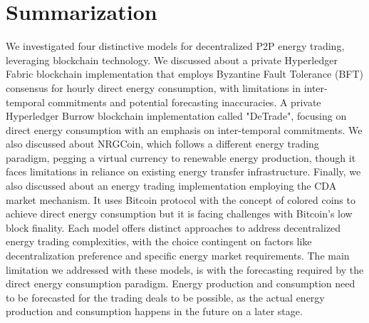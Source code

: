 \section{Summarization}
We investigated four distinctive models for decentralized P2P energy trading, leveraging blockchain technology. We discussed about a private Hyperledger Fabric blockchain implementation that employs Byzantine Fault Tolerance (BFT) 
consensus for hourly direct energy consumption, with limitations in inter-temporal commitments and potential forecasting inaccuracies. A private Hyperledger Burrow blockchain implementation called "DeTrade", focusing on direct energy 
consumption with an emphasis on inter-temporal commitments. We also discussed about NRGCoin, which follows a different energy trading paradigm, pegging a virtual currency to renewable energy production, though it faces limitations in reliance on existing 
energy transfer infrastructure. Finally, we also discussed about an energy trading implementation employing the CDA market mechanism. It uses Bitcoin protocol with the concept of colored coins to achieve direct energy consumption but 
it is facing challenges with Bitcoin's low block finality. Each model offers distinct approaches to address decentralized energy trading complexities, with the choice contingent on factors like decentralization preference and specific energy market requirements.
The main limitation we addressed with these models, is with the forecasting required by the direct energy consumption paradigm. Energy production and consumption need to be forecasted for the trading deals to be possible, as the actual energy production
and consumption happens in the future on a later stage.